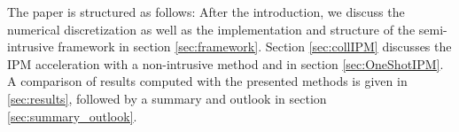 The paper is structured as follows: After the introduction, we discuss the numerical discretization as well as the implementation and structure of the semi-intrusive framework in section \ref{sec:framework}. Section \ref{sec:collIPM} discusses the IPM acceleration with a non-intrusive method and in section \ref{sec:OneShotIPM}. A comparison of results computed with the presented methods is given in \ref{sec:results}, followed by a summary and outlook in section \ref{sec:summary_outlook}.

